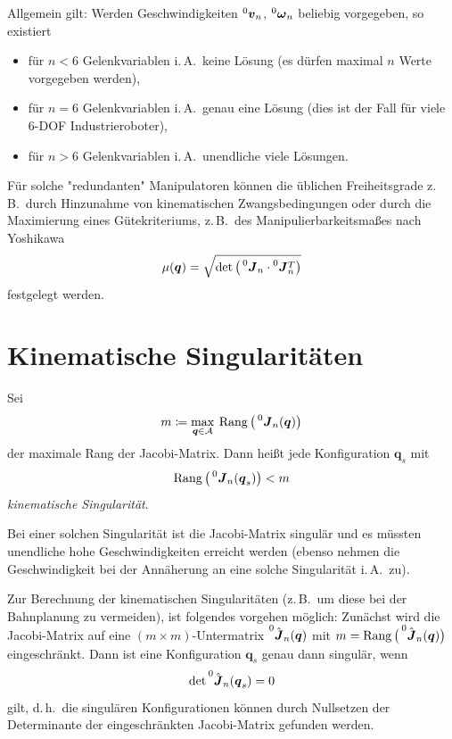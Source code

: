 \documentclass[a4paper, 11pt, accentcolor = tud3b]{tudreport}
\newcommand{\inreferenceto}[2]{\prescript{#1}{}{#2}}
\newcommand{\mat}[1]{\boldsymbol{#1}}
\renewcommand{\vec}[1]{\boldsymbol{#1}}
\DeclareMathOperator{\Rang}{Rang}
\renewcommand{\dh}{d.\,h.~}
\newcommand{\zB}{z.\,B.~}
\newcommand{\iA}{i.\,A.~}
\begin{document}
			Allgemein gilt: Werden Geschwindigkeiten \( \inreferenceto{0}{\vec{v}}_n \), \( \inreferenceto{0}{\vec{\omega}}_n \) beliebig vorgegeben, so existiert
			\begin{itemize}
				\item für \( n < 6 \) Gelenkvariablen \iA keine Lösung (es dürfen maximal \(n\) Werte vorgegeben werden),
				\item für \( n = 6 \) Gelenkvariablen \iA genau eine Lösung (dies ist der Fall für viele \num{6}-DOF Industrieroboter),
				\item für \( n > 6 \) Gelenkvariablen \iA unendliche viele Lösungen.
			\end{itemize}
			Für solche "redundanten" Manipulatoren können die üblichen Freiheitsgrade \zB durch Hinzunahme von kinematischen Zwangsbedingungen oder durch die Maximierung eines Gütekriteriums, \zB des Manipulierbarkeitsmaßes nach Yoshikawa
			\begin{equation*}
				\mu(\vec{q}) = \sqrt{\det \big( \inreferenceto{0}{\mat{J}}_n \cdot \inreferenceto{0}{\mat{J}}_n^T \big)}
			\end{equation*}
			festgelegt werden.

		\section{Kinematische Singularitäten}
			Sei
			\begin{equation*}
				m \coloneqq \max_{\vec{q} \in \mathcal{A}} \> \Rang\big(\inreferenceto{0}{\mat{J}}_n(\vec{q})\big)
			\end{equation*}
			der maximale Rang der Jacobi-Matrix. Dann heißt jede Konfiguration \(\vec{q}_s\) mit
			\begin{equation*}
				\Rang\big(\inreferenceto{0}{\mat{J}}_n(\vec{q}_s)\big) < m
			\end{equation*}
			\emph{kinematische Singularität}.
			
			Bei einer solchen Singularität ist die Jacobi-Matrix singulär und es müssten unendliche hohe Geschwindigkeiten erreicht werden (ebenso nehmen die Geschwindigkeit bei der Annäherung an eine solche Singularität \iA zu).
			
			Zur Berechnung der kinematischen Singularitäten (\zB um diese bei der Bahnplanung zu vermeiden), ist folgendes vorgehen möglich: Zunächst wird die Jacobi-Matrix auf eine \( (m \times m) \)-Untermatrix \( \inreferenceto{0}{\hat{\mat{J}}}_n(\vec{q}) \) mit \( m = \Rang\big(\inreferenceto{0}{\hat{\mat{J}}}_n(\vec{q})\big) \) eingeschränkt. Dann ist eine Konfiguration \(\vec{q}_s\) genau dann singulär, wenn
			\begin{equation*}
				\det \inreferenceto{0}{\hat{\mat{J}}}_n(\vec{q}_s) = 0
			\end{equation*}
			gilt, \dh die singulären Konfigurationen können durch Nullsetzen der Determinante der eingeschränkten Jacobi-Matrix gefunden werden.
\end{document}

